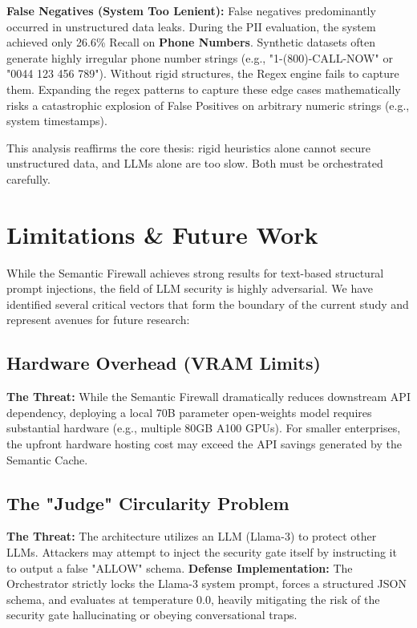 \documentclass[12pt,a4paper]{article}
\begin{document}
\textbf{False Negatives (System Too Lenient):}
False negatives predominantly occurred in unstructured data leaks. During the PII evaluation, the system achieved only 26.6\% Recall on \textbf{Phone Numbers}. Synthetic datasets often generate highly irregular phone number strings (e.g., "1-(800)-CALL-NOW" or "0044 123 456 789"). Without rigid structures, the Regex engine fails to capture them. Expanding the regex patterns to capture these edge cases mathematically risks a catastrophic explosion of False Positives on arbitrary numeric strings (e.g., system timestamps).

This analysis reaffirms the core thesis: rigid heuristics alone cannot secure unstructured data, and LLMs alone are too slow. Both must be orchestrated carefully.



\section{Limitations \& Future Work}

While the Semantic Firewall achieves strong results for text-based structural prompt injections, the field of LLM security is highly adversarial. We have identified several critical vectors that form the boundary of the current study and represent avenues for future research:

\subsection{Hardware Overhead (VRAM Limits)}
\textbf{The Threat:} While the Semantic Firewall dramatically reduces downstream API dependency, deploying a local 70B parameter open-weights model requires substantial hardware (e.g., multiple 80GB A100 GPUs). For smaller enterprises, the upfront hardware hosting cost may exceed the API savings generated by the Semantic Cache.

\subsection{The "Judge" Circularity Problem}
\textbf{The Threat:} The architecture utilizes an LLM (Llama-3) to protect other LLMs. Attackers may attempt to inject the security gate itself by instructing it to output a false "ALLOW" schema.
\textbf{Defense Implementation:} The Orchestrator strictly locks the Llama-3 system prompt, forces a structured JSON schema, and evaluates at temperature $0.0$, heavily mitigating the risk of the security gate hallucinating or obeying conversational traps.
\end{document}
